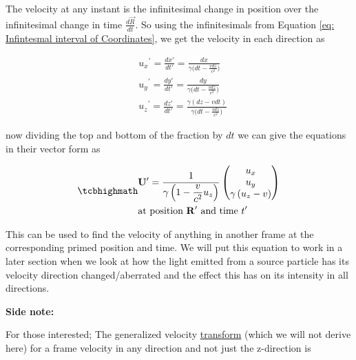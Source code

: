 The velocity at any instant is the infinitesimal change in position over the infinitesimal change in time $\frac{d\vec{R}}{dt}$.
So using the infinitesimals from Equation \eqref{eq: Infintesmal interval of Coordinates}, we get the velocity in each direction as

\begin{equation}
	\begin{aligned}
		 & {{u}_{x}}^{'} = \frac{dx{'}}{dt{'}} = \frac{dx}{{\gamma} \bigg(dt-\frac{vdz}{{c}^2}\bigg) }                   \\
		 & {{u}_{y}}^{'} = \frac{dy{'}}{dt{'}} = \frac{dy}{{\gamma} \bigg(dt-\frac{vdz}{{c}^2}\bigg) }                   \\
		 & {{u}_{z}}^{'} = \frac{dz{'}}{dt{'}} = \frac{{\gamma} (dz - {v}dt)}{{\gamma} \bigg(dt-\frac{vdz}{{c}^2}\bigg) }
	\end{aligned}
\end{equation}

now dividing the top and bottom of the fraction by ${dt}$ we can give the equations in their vector form as

\begin{equation}
	\mhl{
		\begin{aligned}
			 & \mathbf{U}{'} = \dfrac{1}{{\gamma}\left(1-\dfrac{v}{{c}^2} {{u}_{z}}\right) }
			\begin{pmatrix}
				{{u}_{x}}                              \\
				{{u}_{y}}                              \\
				{\gamma} \left( {{u}_{z}}- {v} \right) \\
			\end{pmatrix}
			\\
			 & \text{at position ${\mathbf{R}{'}}$ and time ${t{'}}$ }
		\end{aligned}
	}
	\label{eq: velocity transform}
\end{equation}

This can be used to find the velocity of anything in another frame at the corresponding primed position and time.
We will put this equation to work in a later section when we look at how the light emitted from a source particle has its velocity direction changed/aberrated and the effect this has on its intensity in all directions.

\textbf{Side note:}

For those interested; The generalized velocity \hyperlink{def-transform}{transform} (which we will not derive here) for a frame velocity in any direction and not just the z-direction is

